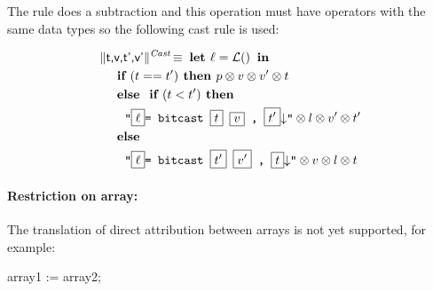 The  rule does a subtraction and this operation must have operators with the same data types so the following cast rule is used:

\begin{align*}
&\trad{t,v,t',v'}{Cast} \isdef \LET  \ell = \lbl \IN \\
&\quad \IF ( t == t') \THEN p \sep v \sep v' \sep t  \\
&\quad \ELSE \IF (t<t') \THEN \\
&\quad \quad \llvm{"\PH{\ell}= bitcast \PH{t} \PH{v} , \PH{t'}\nl"}  \sep l \sep v' \sep t'\\ 
&\quad \ELSE \\ 
&\quad \quad \llvm{"\PH{\ell}= bitcast \PH{t'} \PH{v'} , \PH{t}\nl"} \sep v \sep l \sep t \\ 
\end{align*}

\paragraph{Restriction on array:} The translation of direct attribution
 between arrays is not yet supported, for example:

\begin{pascalcode}
 array1 := array2;
\end{pascalcode}


